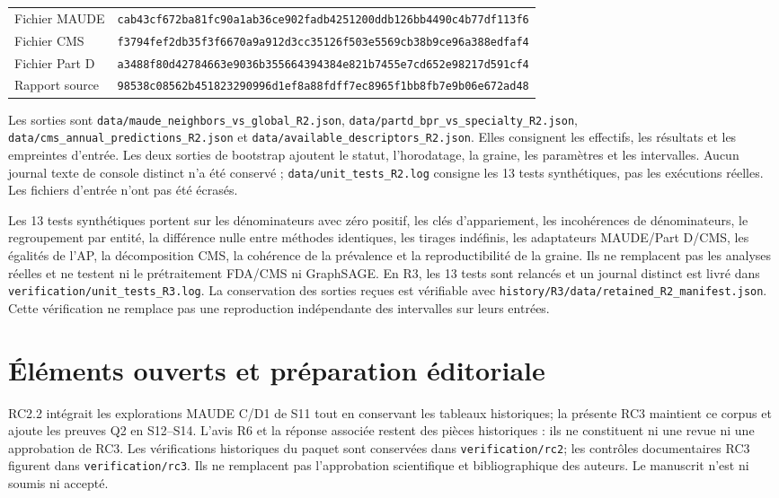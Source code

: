 \documentclass[10pt,a4paper]{article}
\newcommand{\src}[1]{{\small\nolinkurl{#1}}}
\begin{document}
\begin{tabularx}{\linewidth}{@{}lX@{}}
Fichier MAUDE & \src{cab43cf672ba81fc90a1ab36ce902fadb4251200ddb126bb4490c4b77df113f6}\\
Fichier CMS & \src{f3794fef2db35f3f6670a9a912d3cc35126f503e5569cb38b9ce96a388edfaf4}\\
Fichier Part D & \src{a3488f80d42784663e9036b355664394384e821b7455e7cd652e98217d591cf4}\\
Rapport source & \src{98538c08562b451823290996d1ef8a88fdff7ec8965f1bb8fb7e9b06e672ad48}\\
\end{tabularx}

Les sorties sont \src{data/maude_neighbors_vs_global_R2.json}, \src{data/partd_bpr_vs_specialty_R2.json}, \src{data/cms_annual_predictions_R2.json} et \src{data/available_descriptors_R2.json}. Elles consignent les effectifs, les résultats et les empreintes d'entrée. Les deux sorties de bootstrap ajoutent le statut, l'horodatage, la graine, les paramètres et les intervalles. Aucun journal texte de console distinct n'a été conservé ; \src{data/unit_tests_R2.log} consigne les 13 tests synthétiques, pas les exécutions réelles. Les fichiers d'entrée n'ont pas été écrasés.

Les 13 tests synthétiques portent sur les dénominateurs avec zéro positif, les clés d'appariement, les incohérences de dénominateurs, le regroupement par entité, la différence nulle entre méthodes identiques, les tirages indéfinis, les adaptateurs MAUDE/Part D/CMS, les égalités de l'AP, la décomposition CMS, la cohérence de la prévalence et la reproductibilité de la graine. Ils ne remplacent pas les analyses réelles et ne testent ni le prétraitement FDA/CMS ni GraphSAGE.
En R3, les 13 tests sont relancés et un journal distinct est livré dans \src{verification/unit_tests_R3.log}. La conservation des sorties reçues est vérifiable avec \src{history/R3/data/retained_R2_manifest.json}. Cette vérification ne remplace pas une reproduction indépendante des intervalles sur leurs entrées.




\section{Éléments ouverts et préparation éditoriale}
\label{supp:open}
RC2.2 intégrait les explorations MAUDE C/D1 de S11 tout en conservant les tableaux historiques; la présente RC3 maintient ce corpus et ajoute les preuves Q2 en S12--S14. L'avis R6 et la réponse associée restent des pièces historiques : ils ne constituent ni une revue ni une approbation de RC3. Les vérifications historiques du paquet sont conservées dans \src{verification/rc2}; les contrôles documentaires RC3 figurent dans \src{verification/rc3}. Ils ne remplacent pas l'approbation scientifique et bibliographique des auteurs. Le manuscrit n'est ni soumis ni accepté.
\end{document}
